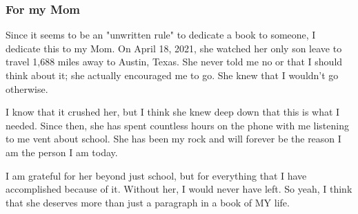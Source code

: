 \subsubsection{For my Mom}
Since it seems to be an "unwritten rule" to dedicate a book to someone, I dedicate
this to my Mom. On April 18, 2021, she watched her only son leave to travel 1,688 miles
away to Austin, Texas. She never told me no or that I should think about it; she actually
encouraged me to go. She knew that I wouldn't go otherwise.

I know that it crushed her,
but I think she knew deep down that this is what I needed. Since then, she has spent countless
hours on the phone with me listening to me vent about school. She has been my rock and
will forever be the reason I am the person I am today.

I am grateful for her beyond just school, but for everything that I have accomplished
because of it. Without her, I would never have left. So yeah, I think that she deserves
more than just a paragraph in a book of MY life.
